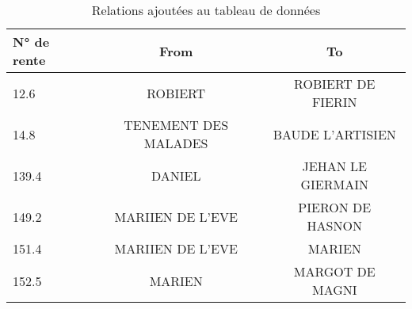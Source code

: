\begin{table}
    \centering
    \begin{tabular}{|l|c|c|}
    \hline
    \textbf{N° de rente} & \textbf{From} & \textbf{To} \\
    \hline
    \hline	12.6	&	ROBIERT	&	ROBIERT DE FIERIN	\\
    \hline	14.8	&	TENEMENT DES MALADES	&	BAUDE L'ARTISIEN	\\
    \hline	139.4	&	DANIEL	&	JEHAN LE GIERMAIN	\\
    \hline	149.2	&	MARIIEN DE L'EVE	&	PIERON DE HASNON	\\
    \hline	151.4	&	MARIIEN DE L'EVE	&	MARIEN	\\
    \hline	152.5	&	MARIEN	&	MARGOT DE MAGNI	\\
    \hline
    \end{tabular}
    \caption{Relations ajoutées au tableau de données}
    \label{tab:corr_relation}
\end{table}
